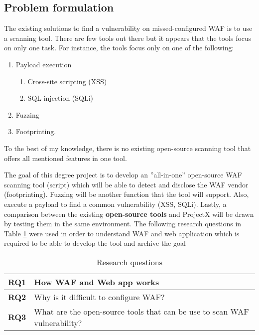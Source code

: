 \documentclass[a4paper,12pt]{article}
\begin{document}
\subsection{Problem formulation}
The existing solutions to find a vulnerability on missed-configured WAF is to use a scanning tool. There are few tools out there but it appears that the tools focus on only one task. For instance, the tools focus only on one of the following: 
\begin{enumerate}
    \item Payload execution 
        \begin{enumerate}
            \item Cross-site scripting (XSS)
            \item SQL injection (SQLi)
        \end{enumerate}
    \item Fuzzing
    \item Footprinting.
\end{enumerate}
To the best of my knowledge, there is no existing open-source scanning tool that offers all mentioned features in one tool. 

The goal of this degree project is to develop an ”all-in-one” open-source WAF scanning tool (script) which will be able to detect and disclose the WAF vendor (footprinting). Fuzzing will be another function that the tool will support. Also, execute a payload to find a common vulnerability (XSS, SQLi). Lastly, a comparison between the existing \textbf{open-source tools} and ProjectX will be drawn by testing them in the same environment. The following research questions in Table \ref{rq} were used in order to understand WAF and web application which is required to be able to develop the tool and archive the goal
\begin{table}[ht]
    \centering
    \begin{tabular} {|p{1.2cm}|p{11.6cm}|} \hline
    \textbf{RQ1} & How WAF and Web app works\\ \hline
    \textbf{RQ2} & Why is it difficult to configure WAF?\\ \hline
    \textbf{RQ3} & What are the open-source tools that can be use to scan WAF vulnerability?\\ \hline
    \end{tabular}\\
    \caption{Research questions}
    \label{rq}
\end{table} 
\end{document}
